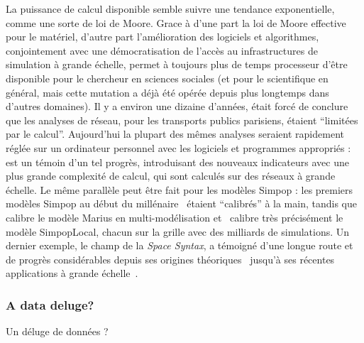 {La puissance de calcul disponible semble suivre une tendance exponentielle, comme une sorte de loi de Moore. Grace à d'une part la loi de Moore effective pour le matériel, d'autre part l'amélioration des logiciels et algorithmes, conjointement avec une démocratisation de l'accès au infrastructures de simulation à grande échelle, permet à toujours plus de temps processeur d'être disponible pour le chercheur en sciences sociales (et pour le scientifique en général, mais cette mutation a déjà été opérée depuis plus longtemps dans d'autres domaines). Il y a environ une dizaine d'années, \cite{gleyze2005vulnerabilite} était forcé de conclure que les analyses de réseau, pour les transports publics parisiens, étaient ``limitées par le calcul''. Aujourd'hui la plupart des mêmes analyses seraient rapidement réglée sur un ordinateur personnel avec les logiciels et programmes appropriés : \cite{2015arXiv151201268L} est un témoin d'un tel progrès, introduisant des nouveaux indicateurs avec une plus grande complexité de calcul, qui sont calculés sur des réseaux à grande échelle. Le même parallèle peut être fait pour les modèles Simpop : les premiers modèles Simpop au début du millénaire~\cite{sanders1997simpop} étaient ``calibrés'' à la main, tandis que \cite{cottineau2015modular} calibre le modèle Marius en multi-modélisation et~\cite{schmitt2014half} calibre très précisément le modèle SimpopLocal, chacun sur la grille avec des milliards de simulations. Un dernier exemple, le champ de la \emph{Space Syntax}, a témoigné d'une longue route et de progrès considérables depuis ses origines théoriques~\cite{hillier1989social} jusqu'à ses récentes applications à grande échelle~\cite{hillier2016fourth}.
}


\subsubsection{A data deluge?}{Un déluge de données ?}

